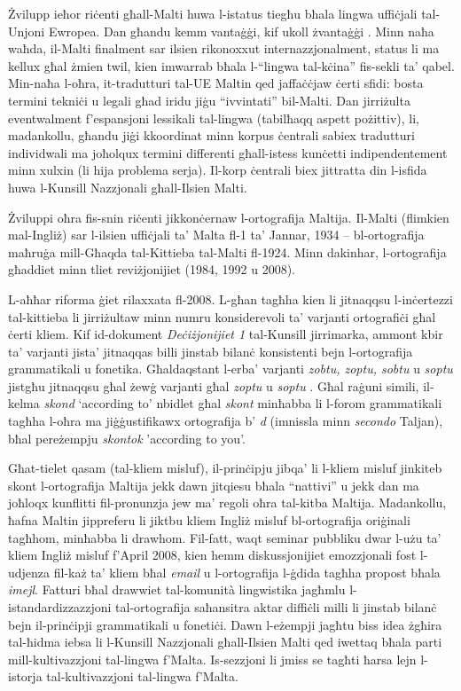 \begin{multicols}{2}
Żvilupp ieħor riċenti għall-Malti huwa l-istatus tiegħu bħala lingwa uffiċjali tal-Unjoni Ewropea. Dan għandu kemm vantaġġi, kif ukoll żvantaġġi \cite{Fabri:2011a}. Minn naħa waħda, il-Malti finalment sar ilsien rikonoxxut internazzjonalment, status li ma kellux għal żmien twil, kien imwarrab bħala l-``lingwa tal-kċina'' fis-sekli ta’ qabel. Min-naħa l-oħra, it-tradutturi tal-UE Maltin qed jaffaċċjaw ċerti sfidi: bosta termini tekniċi u legali għad iridu jiġu ``ivvintati'' bil-Malti. Dan jirriżulta eventwalment f’espansjoni lessikali tal-lingwa (tabilħaqq aspett pożittiv), li, madankollu, għandu jiġi kkoordinat minn korpus ċentrali sabiex tradutturi individwali ma joħolqux termini differenti għall-istess kunċetti indipendentement minn xulxin (li hija problema serja). Il-korp ċentrali biex jittratta din l-isfida huwa l-Kunsill Nazzjonali għall-Ilsien Malti.

Żviluppi oħra fis-snin riċenti jikkonċernaw l-ortografija Maltija. Il-Malti (flimkien mal-Ingliż) sar l-ilsien uffiċjali ta’ Malta fl-1 ta’ Jannar, 1934 – bl-ortografija maħruġa mill-Għaqda tal-Kittieba tal-Malti fl-1924. Minn dakinhar, l-ortografija għaddiet minn tliet reviżjonijiet (1984, 1992 u 2008).

L-aħħar riforma ġiet rilaxxata fl-2008. L-għan tagħha kien li jitnaqqsu l-inċertezzi tal-kittieba li jirriżultaw minn numru konsiderevoli ta’ varjanti ortografiċi għal ċerti kliem. Kif id-dokument \emph{Deċiżjonijiet 1} \cite{Kunsill:2008a} tal-Kunsill  jirrimarka, ammont kbir ta’ varjanti jista' jitnaqqas billi jinstab bilanċ konsistenti bejn l-ortografija grammatikali u fonetika. Għaldaqstant l-erba’ varjanti \emph{zobtu, zoptu, sobtu} u \emph{soptu} jistgħu jitnaqqsu għal żewġ varjanti għal \emph{zoptu}  u \emph{soptu} . Għal raġuni simili, il-kelma \emph{skond}  `according to' nbidlet għal \emph{skont} minħabba li l-forom grammatikali tagħha l-oħra ma jiġġustifikawx ortografija b’ \emph{d} (imnissla minn \emph{secondo} Taljan), bħal pereżempju \emph{skontok}  'according to you'.

Għat-tielet qasam (tal-kliem misluf), il-prinċipju jibqa’ li l-kliem misluf jinkiteb skont l-ortografija Maltija jekk dawn jitqiesu bħala ``nattivi'' u jekk dan ma joħloqx kunflitti fil-pronunzja jew ma’ regoli oħra tal-kitba Maltija. Madankollu, ħafna Maltin jippreferu li jiktbu kliem Ingliż misluf bl-ortografija oriġinali tagħhom, minħabba li drawhom. Fil-fatt, waqt seminar pubbliku dwar l-użu ta’ kliem Ingliż misluf f'April 2008, kien hemm diskussjonijiet emozzjonali fost l-udjenza fil-każ ta’ kliem bħal \emph{email} u l-ortografija l-ġdida tagħha propost bħala \emph{imejl}. Fatturi bħal drawwiet tal-komunità lingwistika jagħmlu l-istandardizzazzjoni tal-ortografija saħansitra aktar diffiċli milli li jinstab bilanċ bejn il-prinċipji grammatikali u fonetiċi.
Dawn l-eżempji jagħtu biss idea żgħira tal-ħidma iebsa li l-Kunsill Nazzjonali għall-Ilsien Malti qed iwettaq bħala parti mill-kultivazzjoni tal-lingwa f'Malta. Is-sezzjoni li jmiss se tagħti ħarsa lejn l-istorja tal-kultivazzjoni tal-lingwa f'Malta.


\end{multicols}
